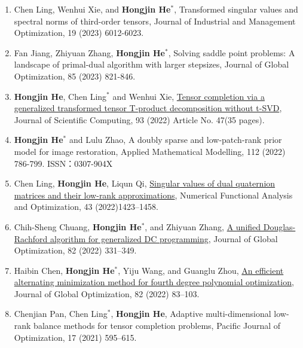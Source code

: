 \begin{enumerate}
	 \item Chen Ling, Wenhui Xie, and {\bf\color{black}Hongjin He}$^*$, Transformed singular values and spectral norms of third-order tensors, Journal of Industrial and Management Optimization, 19 (2023) 6012-6023.
	 
	 \item Fan Jiang, Zhiyuan Zhang, {\bf\color{black}Hongjin He}$^*$, Solving saddle point problems: A landscape of primal-dual algorithm with larger stepsizes, Journal of Global Optimization, 85 (2023) 821-846.
	 
	  \item {\bf\color{black}Hongjin He}, Chen Ling$^*$ and Wenhui Xie, \href{https://doi.org/10.1007/s10915-022-02006-3}{\color{blue}Tensor completion via a generalized transformed tensor T-product decomposition without t-SVD}, Journal of Scientific Computing, 93 (2022) Article No. 47(35 pages).
	 	  
	 \item {\bf\color{black}Hongjin He}$^*$ and Lulu Zhao, A doubly sparse and low-patch-rank prior model for image restoration, Applied Mathematical Modelling, 112 (2022) 786-799. ISSN：0307-904X
	 
	 \item Chen Ling, {\bf\color{black}Hongjin He}, Liqun Qi, \href{https://doi.org/10.1080/01630563.2022.2108835}{Singular values of dual quaternion matrices and their low-rank approximations}, Numerical Functional Analysis and Optimization, 43 (2022)1423--1458.
	 
	\item Chih-Sheng Chuang, {\bf\color{black}Hongjin He}$^*$, and Zhiyuan Zhang, \href{https://doi.org/10.1007/s10898-021-01079-y}{\color{blue}A unified Douglas-Rachford algorithm for generalized DC programming},  Journal of Global Optimization, 82 (2022) 331--349.
	    
	 \item Haibin Chen, {\bf\color{black}Hongjin He}$^*$, Yiju Wang, and Guanglu Zhou, \href{https://link.springer.com/article/10.1007/s10898-021-01060-9}{An efficient alternating minimization method for fourth degree polynomial optimization}, Journal of Global Optimization, 82 (2022) 83--103.
	 
	 \item Chenjian Pan, Chen Ling$^*$,  {\bf\color{black}Hongjin He},  Adaptive multi-dimensional low-rank balance methods for tensor completion problems,  Pacific Journal of Optimization, 17 (2021) 595--615.
	    

\end{enumerate}
